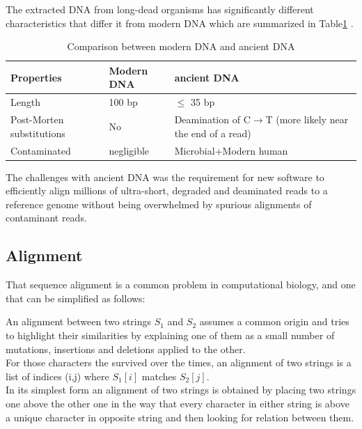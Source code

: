 \documentclass[11pt,a4paper]{report}
\begin{document}
The extracted DNA from long-dead organisms has significantly different characteristics
 that differ it from modern DNA which are summarized in Table\ref{aDNAchar} .\\



\begin{table}[H]
  \begin{tabular}{ |  p{4cm} | p{2cm} | p{5cm} |}
    \hline
  \textbf{  Properties} & \textbf{Modern DNA } &\textbf{ ancient DNA} \\ \hline
       Length &  100 bp  & $\leq$  35 bp \\ \hline
       Post-Morten substitutions & No  & Deamination of C$\to$T
(more likely near the end of a read) \\ \hline
  Contaminated & negligible & Microbial+Modern human\\ \hline
    \end{tabular}
\caption{Comparison between modern DNA and ancient DNA}
\label{aDNAchar}
\end{table}


The challenges with ancient DNA was the requirement for new software to efficiently 
align millions of ultra-short, degraded and deaminated reads to a reference genome 
without being overwhelmed by spurious alignments of contaminant reads.


\subsection{Alignment} \label{Alignment}

That sequence alignment is a common problem in computational biology, 
and one that can be simplified as follows:

An alignment between two strings $S_{1}$ and $S_{2}$ assumes a common origin and 
tries to highlight their similarities by explaining one of them as a small number 
of mutations, insertions and deletions applied to the other.\\

For those characters the survived over the times, an alignment of two strings is 
a list of indices (i,j) where $S_{1}[i]$ matches $S_{2}[j]$.\\ 
In its simplest form an alignment of two strings is obtained by placing two strings
one above the other one in the way that every character in either string is above 
a unique character in opposite string and then looking for relation between them.\\\\
\end{document}
